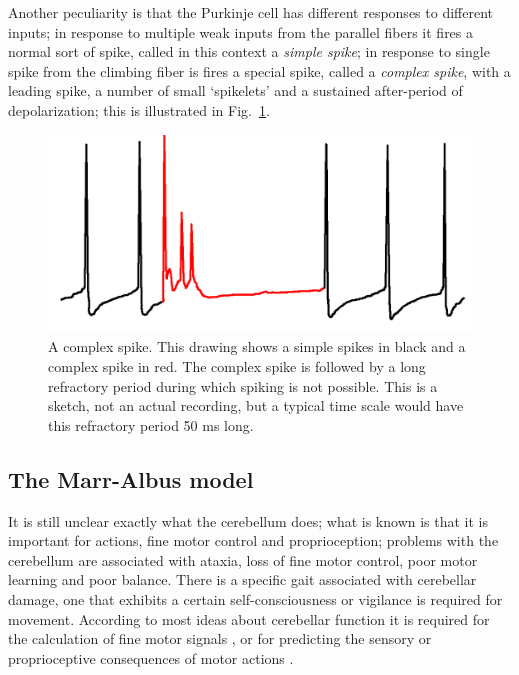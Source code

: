 \documentclass[11pt,a4paper]{scrartcl}
\begin{document}
Another peculiarity is that the Purkinje cell has different responses
to different inputs; in response to multiple weak inputs from the
parallel fibers it fires a normal sort of spike, called in this
context a \textsl{simple spike}; in response to single spike from the
climbing fiber is fires a special spike, called a \textsl{complex
  spike}, with a leading spike, a number of small \lq{}spikelets\rq{}
and a sustained after-period of depolarization; this is illustrated in
Fig.~\ref{fig:spikes}.

\begin{figure}
\begin{center}
\includegraphics[width=8.cm]{complex_spike.png}
\end{center}
\caption{A complex spike. This drawing shows a simple spikes in black
  and a complex spike in red. The complex spike is followed by a long
  refractory period during which spiking is not possible. This is a
  sketch, not an actual recording, but a typical time scale would have
  this refractory period 50 ms long.\label{fig:spikes}}
\end{figure}

\subsection*{The Marr-Albus model}

It is still unclear exactly what the cerebellum does; what is known is
that it is important for actions, fine motor control and
proprioception; problems with the cerebellum are associated with
ataxia, loss of fine motor control, poor motor learning and poor
balance. There is a specific gait associated with cerebellar damage,
one that exhibits a certain self-consciousness or vigilance is
required for movement. According to most ideas about cerebellar
function it is required for the calculation of fine motor signals
\cite{Albus1971a}, or for predicting the sensory or proprioceptive
consequences of motor actions \cite{GaoEtAl1996a}.
\end{document}
